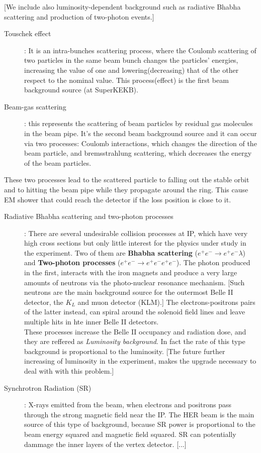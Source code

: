 [We include also luminosity-dependent background such as radiative Bhabha scattering and production of two-photon events.]


\begin{description}
\item[Touschek effect]: 
	It is an intra-bunches scattering process, where the Coulomb scattering of two particles in the same beam bunch changes the particles' energies, increasing the value of one and lowering(decreasing) that of the other respect to the nominal value. This process(effect) is the first beam background source (at SuperKEKB).
\item[Beam-gas scattering]: 
	this represents the scattering of beam particles by residual gas molecules in the beam pipe. It's the second beam background source and it can occur via two processes: Coulomb interactions, which changes the direction of the beam particle, and bremsstrahlung scattering, which decreases the energy of the beam particles. 
\end{description}
	
These two processes lead to the scattered particle to falling out the stable orbit and to hitting the beam pipe while they propagate around the ring. This cause EM shower that could reach the detector if the loss position is close to it.

\begin{description}
\item[Radiative Bhabha scattering and two-photon processes]:
	There are several undesirable collision processes at IP, which have very high cross sections but only little interest for the physics under study in the experiment. Two of them are \textbf{Bhabha scattering} ($e^{+}e^{-} \rightarrow e^{+}e^{-} \lambda$) and \textbf{Two-photon processes} ($e^{+}e^{-} \rightarrow e^{+}e^{-}e^{+}e^{-} $). The photon produced in the first, interacts with the iron magnets and produce a very large amounts of neutrons via the photo-nuclear resonance mechanism. [Such neutrons are the main background source for the outermost Belle II detector, the $K_{L}$ and muon detector (KLM).] The electrons-positrons pairs of the latter instead, can spiral around the solenoid field lines and leave multiple hits in hte inner Belle II detectors.\\
	
These processes increase the Belle II occupancy and radiation dose, and they are reffered as \textit{Luminosity background}. In fact the rate of this type background is proportional to the luminosity. [The future further increasing of luminosity in the experiment, makes the upgrade necessary to deal with with this problem.]

\item[Synchrotron Radiation (SR)]:
	X-rays emitted from the beam, when electrons and positrons pass through the strong magnetic field near the IP. The HER beam is the main source of this type of background, because SR power is proportional to the beam energy squared and magnetic field squared.
SR can potentially dammage the inner layers of the vertex detector. [...]
\end{description}

